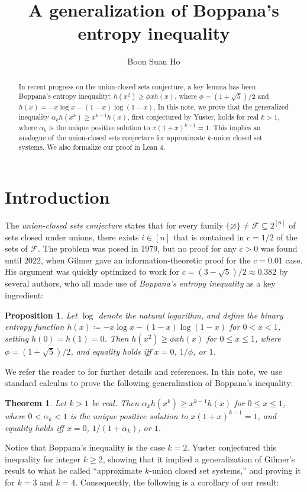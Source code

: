 \documentclass[twoside]{amsart} %
\newtheorem{proposition}{Proposition}
\newtheorem{theorem}{Theorem}
\begin{document}
\title{A generalization of Boppana's entropy inequality}
\author{Boon Suan Ho}
\address{Department of Mathematics, National University of Singapore}


\begin{abstract} 
In recent progress on the union-closed sets conjecture, 
a key lemma has been Boppana's entropy inequality:
$h(x^2)\ge\phi xh(x)$, where $\phi=(1+\sqrt5)/2$ and $h(x)=-x\log x-(1-x)\log(1-x)$.
In this note, we prove that the generalized inequality
$\alpha_kh(x^k)\ge x^{k-1}h(x)$, first conjectured by Yuster, holds for real $k>1$, 
where $\alpha_k$ is the unique positive solution to $x(1+x)^{k-1}=1$. 
This implies an analogue of the union-closed sets conjecture
for approximate $k$-union closed set systems.
We also formalize our proof in Lean 4.
\end{abstract}

\maketitle

\section{Introduction}
The \emph{union-closed sets conjecture} states that for every
family $\{\varnothing\}\ne\mathcal F\subseteq2^{[n]}$ of sets closed
under unions, there exists $i\in[n]$ that is contained in $c=1/2$ of 
the sets of $\mathcal F$. The problem was posed in 1979, but no proof
for any $c>0$ was found until 2022, when Gilmer \cite{gil} gave an information-theoretic
proof for the $c=0.01$ case. His argument was quickly optimized to work for 
$c=(3-\sqrt5)/2\approx0.382$ by several authors, who all made use of \emph{Boppana's entropy inequality} \cite{bop} as a key ingredient:
\begin{proposition}
Let $\log$ denote the natural logarithm, and define the binary entropy function
$h(x)\coloneqq-x\log x-(1-x)\log(1-x)$ for $0<x<1$, setting $h(0)=h(1)=0$. 
Then $h(x^2)\ge\phi xh(x)$ for $0\le x\le1$, where $\phi=(1+\sqrt5)/2$,
and equality holds iff $x=0$, $1/\phi$, or $1$.
\end{proposition}
\noindent We refer the reader to \cite{cam} for further details and references.
In this note, we use standard calculus to prove the following generalization of Boppana's inequality:
\begin{theorem}
Let $k>1$ be real. Then $\alpha_kh(x^k)\ge x^{k-1}h(x)$ for $0\le x\le1$, where
$0<\alpha_k<1$ is the unique positive solution to $x(1+x)^{k-1}=1$,
and equality holds iff $x=0$, $1/(1+\alpha_k)$, or $1$.
\end{theorem}
\noindent Notice that Boppana's inequality is the case $k=2$.
Yuster \cite{yus1} conjectured this inequality for integer $k\ge2$, showing
that it implied a generalization of Gilmer's result to what he called
``approximate $k$-union closed set systems,'' and
proving it for $k=3$ and $k=4$. Consequently,
the following is a corollary of our result:
\end{document}

